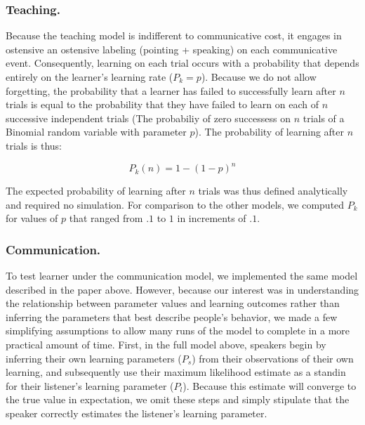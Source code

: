 \documentclass[english,,man,floatsintext]{apa6}
\begin{document}
\hypertarget{teaching.}{%
\subsubsection{Teaching.}\label{teaching.}}

Because the teaching model is indifferent to communicative cost, it engages in ostensive an ostensive labeling (pointing + speaking) on each communicative event. Consequently, learning on each trial occurs with a probability that depends entirely on the learner's learning rate (\(P_{k}=p\)). Because we do not allow forgetting, the probability that a learner has failed to successfully learn after \(n\) trials is equal to the probability that they have failed to learn on each of \(n\) successive independent trials (The probabiliy of zero successess on \(n\) trials of a Binomial random variable with parameter \(p\)). The probability of learning after \(n\) trials is thus:

\[ P_k(n) = 1 - \left(1-p\right)^{n}  \]

The expected probability of learning after \(n\) trials was thus defined analytically and required no simulation. For comparison to the other models, we computed \(P_{k}\) for values of \(p\) that ranged from \(.1\) to \(1\) in increments of \(.1\).

\hypertarget{communication.}{%
\subsubsection{Communication.}\label{communication.}}

To test learner under the communication model, we implemented the same model described in the paper above. However, because our interest was in understanding the relationship between parameter values and learning outcomes rather than inferring the parameters that best describe people's behavior, we made a few simplifying assumptions to allow many runs of the model to complete in a more practical amount of time. First, in the full model above, speakers begin by inferring their own learning parameters (\(P_{s}\)) from their observations of their own learning, and subsequently use their maximum likelihood estimate as a standin for their listener's learning parameter (\(P_{l}\)). Because this estimate will converge to the true value in expectation, we omit these steps and simply stipulate that the speaker correctly estimates the listener's learning parameter.
\end{document}
